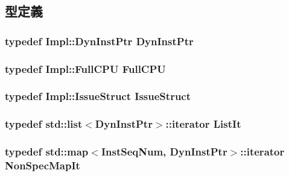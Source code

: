 \subsection{型定義}
\hypertarget{classInstQueue_a028ce10889c5f6450239d9e9a7347976}{
\subsubsection[{DynInstPtr}]{\setlength{\rightskip}{0pt plus 5cm}typedef Impl::DynInstPtr {\bf DynInstPtr}}}
\label{classInstQueue_a028ce10889c5f6450239d9e9a7347976}
\hypertarget{classInstQueue_a90ba84e54618cc07f2e8f05e046cb5ce}{
\subsubsection[{FullCPU}]{\setlength{\rightskip}{0pt plus 5cm}typedef Impl::FullCPU {\bf FullCPU}}}
\label{classInstQueue_a90ba84e54618cc07f2e8f05e046cb5ce}
\hypertarget{classInstQueue_a568c86f6403070f1cb743e994405ba8b}{
\subsubsection[{IssueStruct}]{\setlength{\rightskip}{0pt plus 5cm}typedef Impl::IssueStruct {\bf IssueStruct}}}
\label{classInstQueue_a568c86f6403070f1cb743e994405ba8b}
\hypertarget{classInstQueue_a184cb829e22cc656acb41864f68f51ea}{
\subsubsection[{ListIt}]{\setlength{\rightskip}{0pt plus 5cm}typedef {\bf std::list}$<${\bf DynInstPtr}$>$::iterator {\bf ListIt}}}
\label{classInstQueue_a184cb829e22cc656acb41864f68f51ea}
\hypertarget{classInstQueue_a0e9597437fae9e60d5449933949416ec}{
\subsubsection[{NonSpecMapIt}]{\setlength{\rightskip}{0pt plus 5cm}typedef std::map$<${\bf InstSeqNum}, {\bf DynInstPtr}$>$::iterator {\bf NonSpecMapIt}}}
